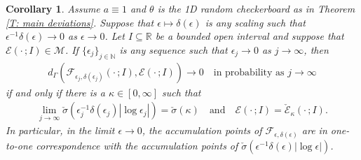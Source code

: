 \documentclass[12pt]{amsart}
\newtheorem{corollary}{Corollary}
\begin{document}
\begin{corollary} \label{C: characterize gamma limits} Assume $a \equiv 1$ and $\theta$ is the 1D random checkerboard as in Theorem \ref{T: main deviations}.  Suppose that $\epsilon \mapsto \delta(\epsilon)$ is any scaling such that $\epsilon^{-1} \delta(\epsilon) \to 0$ as $\epsilon \to 0$.  Let $I \subseteq \mathbb{R}$ be a bounded open interval and suppose that $\mathscr{E}(\cdot \, ; I) \in \mathcal{M}$. If $\{\epsilon_{j}\}_{j \in \mathbb{N}}$ is any sequence such that $\epsilon_{j} \to 0$ as $j \to \infty$, then
    \begin{align*}
        d_{\Gamma}( \mathscr{F}_{\epsilon_{j},\delta(\epsilon_{j})}(\cdot \, ; I ) , \mathscr{E} ( \cdot \, ; I ) ) \to 0 \quad \text{in probability as} \, \, j \to \infty
    \end{align*}
if and only if there is a $\kappa \in [0,\infty]$ such that 
    \begin{align*}
        \lim_{ j \to \infty } \check{\sigma} ( \epsilon_{j}^{-1} \delta(\epsilon_{j}) | \log \epsilon_{j} | ) = \check{\sigma}(\kappa) \quad \text{and} \quad \mathscr{E}( \cdot \, ; I ) = \check{\mathscr{E}}_{\kappa}(\cdot \, ; I ) . 
    \end{align*}
In particular, in the limit $\epsilon \to 0$, the accumulation points of $\mathscr{F}_{\epsilon,\delta(\epsilon)}$ are in one-to-one correspondence with the accumulation points of $\check{\sigma}(\epsilon^{-1} \delta(\epsilon) |\log \epsilon|)$. \end{corollary}
\end{document}
